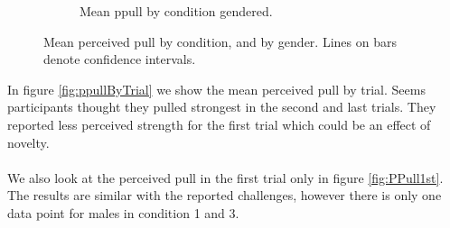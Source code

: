 \begin{figure}[H]
\begin{subfigure}[b]{0.5\textwidth}
     \caption{Mean ppull by condition gendered.}
     \label{fig:fig:meanPPullGenCond}
 \end{subfigure}
     \caption{Mean perceived pull by condition, and by gender. Lines on bars denote confidence intervals.}
    \label{fig:ppullByCond}
\end{figure}

In figure \ref{fig:ppullByTrial} we show the mean perceived pull by trial. Seems participants thought they pulled strongest in the second and last trials. They reported less perceived strength  for the first trial which could be an effect of novelty.\\
\\
We also look at the perceived pull in the first trial only in figure \ref{fig:PPull1st}. The results are similar with the reported challenges, however there is only one data point for males in condition 1 and 3. 


